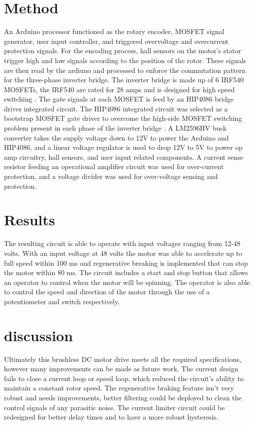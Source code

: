 \documentclass[journal,10pt]{IEEEtran}
\begin{document}
\section{Method}
	An Arduino processor functioned as the rotary encoder, MOSFET signal generator, user input controller, and triggered overvoltage and overcurrent protection signals. For the encoding process, hall sensors on the motor’s stator trigger high and low signals according to the position of the rotor. These signals are then read by the ardiuno and processed to enforce the commutation pattern for the three-phase inverter bridge. The inverter bridge is made up of 6 IRF540 MOSFETs, the IRF540 are rated for 28 amps and is designed for high speed switching \cite{irf}. The gate signals at each MOSFET is feed by an HIP4086 bridge driver integrated circuit. The HIP4086 integrated circuit was selected as a bootstrap MOSFET gate driver to overcome the high-side MOSFET switching problem present in each phase of the inverter bridge \cite{hip}. A LM2596HV buck converter takes the supply voltage down to 12V to power the Arduino and HIP4086, and a linear voltage regulator is used to drop 12V to 5V to power op amp circuitry, hall sensors, and user input related components. A current sense resistor feeding an operational amplifier circuit was used for over-current protection, and a voltage divider was used for over-voltage sensing and protection.
    
\section{Results}
	The resulting circuit is able to operate with input voltages ranging from 12-48 volts.  With an input voltage at 48 volts the motor was able to accelerate up to full speed within 100 ms and regenerative breaking is implemented that can stop the motor within 80 ms. The circuit includes a start and stop button that allows an operator to control when the motor will be spinning. The operator is also able to control the speed and direction of the motor through the use of a potentiometer and switch respectively. 

\section{discussion}
	Ultimately this brushless DC motor drive meets all the required specifications, however many improvements can be made as future work. The current design fails to close a current loop or speed loop, which reduced the circuit's ability to maintain a constant rotor speed. The regenerative braking feature isn't very robust and needs improvements, better filtering could be deployed to clean the control signals of any parasitic noise. The current limiter circuit could be redesigned for better delay times and to have a more robust hysteresis. 





\end{document}
